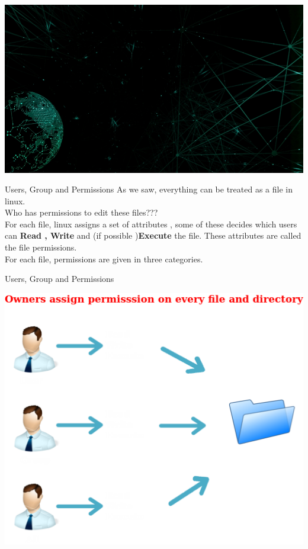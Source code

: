 \documentclass{beamer}
\begin{document}
{
	\usebackgroundtemplate%
	{%
	    \includegraphics[width=\paperwidth,height=\paperheight]{./back_net.jpg}%
	}
\selectfont
\begin{frame}{Users, Group and Permissions}
	As we saw, everything can be treated as a file in linux. \\
	\pause
	Who has permissions to edit these files???\\
	\pause
	For each file, linux assigns a set of attributes , some of these decides which users can {\textbf{Read , Write}} and (if possible )\textbf{Execute} the file. These attributes are called the file permissions. \\
	\pause
	For each file, permissions are given in three categories.
			
\end{frame}
\begin{frame}{Users, Group and Permissions}
\begin{center}
		\includegraphics[scale=0.16]{./file_permissions2.png}%
\end{center}
\end{frame}

}
\end{document}
